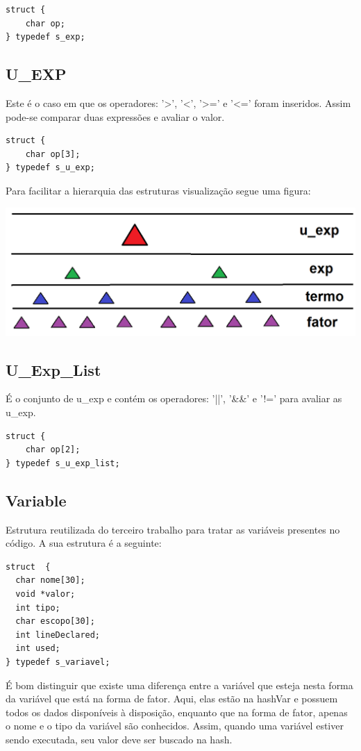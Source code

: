 \documentclass[a4paper,10pt]{article}
\begin{document}
\begin{lstlisting}
struct {
	char op;
} typedef s_exp;
\end{lstlisting}

\subsection{U\_EXP}

Este é o caso em que os operadores: '>', '<', '>=' e '<=' foram inseridos. Assim pode-se comparar duas expressões e avaliar o valor.

\begin{lstlisting}
struct {
	char op[3];
} typedef s_u_exp;
\end{lstlisting}
Para facilitar a hierarquia das estruturas visualização segue uma figura:

\includegraphics[scale=0.4]{figurinha.png}


\subsection{U\_Exp\_List}

É o conjunto de u\_exp e contém os operadores: '||', '\&\&' e '!=' para avaliar as u\_exp.

\begin{lstlisting}
struct {
	char op[2];
} typedef s_u_exp_list;
\end{lstlisting}

\subsection{Variable}

Estrutura reutilizada do terceiro trabalho para tratar as variáveis presentes no código. A sua estrutura é a seguinte:

\begin{lstlisting}
struct  {
  char nome[30];
  void *valor;
  int tipo;
  char escopo[30];
  int lineDeclared;
  int used;
} typedef s_variavel;
\end{lstlisting}
É bom distinguir que existe uma diferença entre a variável que esteja nesta forma da variável que está na forma de fator. Aqui, elas estão na
hashVar e possuem todos os dados disponíveis à disposição, enquanto que na forma de fator, apenas o nome e o tipo da variável são conhecidos. Assim,
quando uma variável estiver sendo executada, seu valor deve ser buscado na hash.
\end{document}
